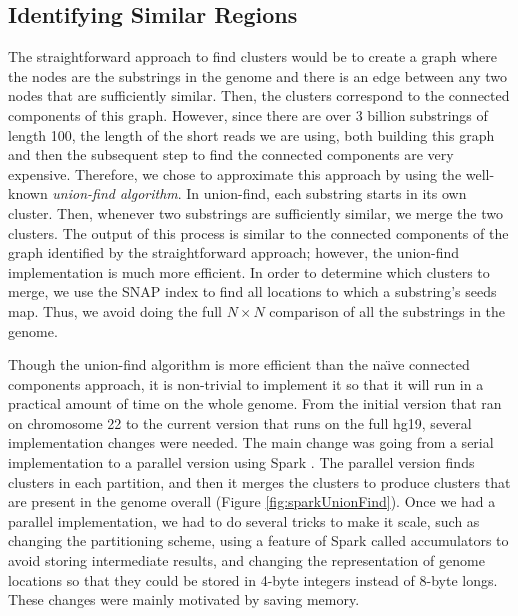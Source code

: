 \documentclass[twocolumn,10pt]{article}
\begin{document}
\subsection{Identifying Similar Regions}
\label{section:identifyingSimilarRegions}

The straightforward approach to find clusters would be to create a graph where the nodes are the substrings in the genome and there is an edge between any two nodes that are sufficiently similar.  Then, the clusters correspond to the connected components of this graph.  However, since there are over 3 billion substrings of length 100, the length of the short reads we are using, both building this graph and then the subsequent step to find the connected components are very expensive.  Therefore, we chose to approximate this approach by using the well-known \textit{union-find algorithm}.  In union-find, each substring starts in its own cluster.  Then, whenever two substrings are sufficiently similar, we merge the two clusters.  The output of this process is similar to the connected components of the graph identified by the straightforward approach; however, the union-find implementation is much more efficient.  In order to determine which clusters to merge, we use the SNAP index to find all locations to which a substring's seeds map.  Thus, we avoid doing the full \(N \times N\) comparison of all the substrings in the genome.

Though the union-find algorithm is more efficient than the na\"{\i}ve connected components approach, it is non-trivial to implement it so that it will run in a practical amount of time on the whole genome.  From the initial version that ran on chromosome 22 to the current version that runs on the full hg19, several implementation changes were needed.  The main change was going from a serial implementation to a parallel version using Spark \cite{Zaharia:2012}.  The parallel version finds clusters in each partition, and then it merges the clusters to produce clusters that are present in the genome overall (Figure \ref{fig:sparkUnionFind}).  Once we had a parallel implementation, we had to do several tricks to make it scale, such as changing the partitioning scheme, using a feature of Spark called accumulators to avoid storing intermediate results, and changing the representation of genome locations so that they could be stored in 4-byte integers instead of 8-byte longs.  These changes were mainly motivated by saving memory.
\end{document}
